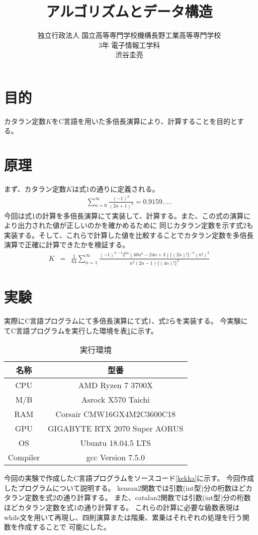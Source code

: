 \documentclass[a4j,dvipdfmx,titlepage]{jarticle}
\title{アルゴリズムとデータ構造}
\author{独立行政法人 国立高等専門学校機構長野工業高等専門学校
\\
3年 電子情報工学科
\\
渋谷圭亮
\\
}
\begin{document}
\maketitle
\section{目的}
カタラン定数$K$をC言語を用いた多倍長演算により、計算することを目的とする。
\section{原理}
まず、カタラン定数$K$は式1の通りに定義される。
\begin{eqnarray}
    \sum^{\infty}_{n=0}\frac{(-1)^{n}}{(2n+1)^2}=0.9159.....
\end{eqnarray}
今回は式1の計算を多倍長演算にて実装して、計算する。また、この式の演算により出力された値が正しいのかを確かめるために
同じカタラン定数を示す式2も実装する。そして、これらで計算した値を比較することでカタラン定数を多倍長演算で正確に計算できたかを検証する。
\begin{eqnarray}
    K&=&\frac{1}{64}\sum^{\infty}_{n=1}\frac{(-1)^{n-1}2^{8n}(40n^2-24n+3)\{(2n)!\}^{-3}(n!)^2}{n^3(2n-1)\{(4n)!\}^2}
\end{eqnarray}
\section{実験}
実際にC言語プログラムにて多倍長演算にて式1、式2らを実装する。
今実験にてC言語プログラムを実行した環境を表\ref{a}に示す。
\begin{table}[htb]
    \begin{center}
      \caption{実行環境}
      \begin{tabular}{c|c} 
       名称 & 型番 \\ \hline 
        CPU & AMD Ryzen 7 3700X\\
         M/B & Asrock X570 Taichi \\
         RAM &  Corsair CMW16GX4M2C3600C18\\
         GPU & GIGABYTE RTX 2070 Super AORUS\\
        OS & Ubuntu 18.04.5 LTS\\ 
        Compiler & gcc Version 7.5.0\\ 
      \end{tabular}
      \label{a}
\end{center}
\end{table}
今回の実験で作成したC言語プログラムをソースコード\ref{kekka}に示す。
今回作成したプログラムについて説明する。
kensan2関数では引数(int型)分の桁数ほどカタラン定数を式2の通り計算する。
また、catalan2関数では引数(int型)分の桁数ほどカタラン定数を式1の通り計算する。
これらの計算に必要な級数表現はwhile文を用いて再現し、四則演算または階乗、累乗はそれぞれの処理を行う関数を作成することで
可能にした。
\end{document}
